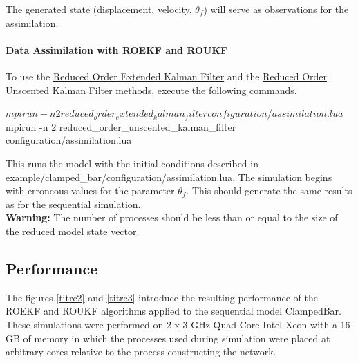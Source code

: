 \-The generated state (displacement, velocity, $ \theta_{f} $) will serve as observations for the assimilation.



\hypertarget{par-seq-example-dam}{}\paragraph{Data Assimilation with ROEKF and ROUKF}\label{par-seq-example-dam}


\-To use the \hyperlink{reduced_order_extended_kalman_filter}{\-Reduced \-Order \-Extended \-Kalman \-Filter} and the \hyperlink{reduced_order_unscented_kalman_filter}{\-Reduced \-Order \-Unscented \-Kalman \-Filter} methods, execute the following commands.
\begin{frame_bash}
$ mpirun -n 2 reduced_order_extended_kalman_filter configuration/assimilation.lua
$ mpirun -n 2 reduced_order_unscented_kalman_filter configuration/assimilation.lua
\end{frame_bash}
  \-This runs the model with the initial conditions described in {\ttfamily example/clamped\-\_\-bar/configuration/assimilation.\-lua}. \-The simulation begins with erroneous values for the parameter $ \theta_f $. \-This should generate the same results as for the sequential simulation.\\


  \textbf{Warning:}  The number of processes should be less than or equal to the size of the reduced model state vector.



\hypertarget{par-seq-performance}{}\subsection{Performance}\label{par-seq-performance}

The figures \ref{titre2} and \ref{titre3} introduce the resulting performance of the ROEKF and ROUKF algorithms applied to the sequential model ClampedBar. These simulations were performed on 2 x 3 GHz Quad-Core Intel Xeon with a 16 GB of memory in which the processes used during simulation were placed at arbitrary cores relative to the process constructing the network.

